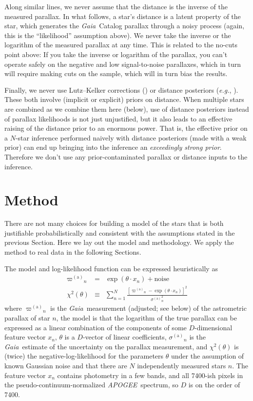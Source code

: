 \documentclass[modern]{aastex62}
\newcommand{\sectionname}{Section}
\newcommand{\foreign}[1]{\textsl{#1}}
\newcommand{\eg}{\foreign{e.g.}}
\newcommand{\acronym}[1]{{\small{#1}}}
\newcommand{\project}[1]{\textsl{#1}}
\newcommand{\apogee}{\project{\acronym{APOGEE}}}
\newcommand{\gaia}{\project{Gaia}}
\newcommand{\gparallax}{{\varpi^{(\mathrm{a})}}}
\newcommand{\gsigma}{{\sigma^{(\mathrm{a})}}}
\begin{document}
Along similar lines, we never assume that the distance is the inverse of the
measured parallax.
In what follows, a star's distance is a latent property of the star, which generates
the \gaia\ Catalog parallax through a noisy process (again, this is
the ``likelihood'' assumption above).
We never take the inverse or the logarithm of the measured parallax at any time.
This is related to the no-cuts point above:
If you take the inverse or logarithm of the parallax, you can't operate safely
on the negative and low signal-to-noise parallaxes, which in turn will require
making cuts on the sample, which will in turn bias the results.

Finally, we never use Lutz--Kelker corrections (\citealt{lk}) or distance
posteriors (\eg, \citealt{calj}). These both involve (implicit or explicit) priors on 
distance.
When multiple stars are combined as we combine them here (below),
use of distance posteriors instead of parallax likelihoods is not just
unjustified, but it also leads to an
effective raising of the distance prior to an enormous power.
That is, the effective prior on a $N$-star inference performed naively
with distance posteriors (made with a weak prior) can end up
bringing into the inference an \emph{exceedingly
strong prior}.
Therefore we don't use any prior-contaminated parallax or distance
inputs to the inference.

\section{Method}

There are not many choices
for building a model of the stars that is both justifiable probabilistically
and consistent with the assumptions stated in the previous \sectionname.
Here we lay out the model and methodology.
We apply the method to real data in the following {\sectionname s}.

The model and log-likelihood function can be expressed heuristically as
\begin{eqnarray}
\gparallax_n &=& \exp(\theta\cdot x_n) + \mbox{noise}
\\
\chi^2(\theta) &\equiv& \sum_{n=1}^N \frac{[\gparallax_n - \exp(\theta\cdot x_n)]^2}{\gsigma_n^2}
\end{eqnarray}
where
$\gparallax_n$ is the \gaia\ measurement (adjusted; see below) of the astrometric parallax of star $n$,
the model is that the logarithm of the true parallax
can be expressed as a linear combination of the components
of some $D$-dimensional feature vector $x_n$,
$\theta$ is a $D$-vector of linear coefficients,
$\gsigma_n$ is the \gaia\ estimate of the uncertainty on the parallax measurement,
and $\chi^2(\theta)$ is (twice) the negative-log-likelihood for the parameters $\theta$
under the assumption of known Gaussian noise and
that there are $N$ independently measured stars $n$.
The feature vector $x_n$ contains photometry in a few bands, and all 7400-ish pixels
in the pseudo-continuum-normalized \apogee\ spectrum, so $D$ is on the order of 7400.
\end{document}
